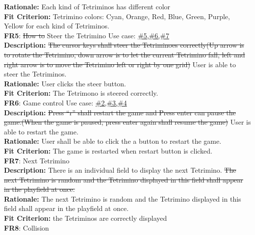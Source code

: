\documentclass[12pt, titlepage]{article}
\begin{document}
\textbf{Rationale: }{\color{red}     Each kind of Tetriminos has different color} \\ 
\textbf{Fit Criterion:} Tetrimino colors: Cyan, Orange, Red, Blue, Green, Purple, Yellow {\color{red}    for each kind of Tetriminos.} \\
\newline
\textbf{FR5}: \st{How to }Steer the Tetrimino   \tab Use case: \hyperref[event:pausethegame]{\#5,}\hyperref[event:rotate]{\#6,\#7} \\
\textbf{Description:} \st{The cursor keys shall steer the Tetriminoes correctly(Up arrow is to rotate the Tetrimino, down arrow is to let the current Tetrimino fall, left and right arrow is to move the Tetrimino left or right by one grid)}{\color{red}    User is able to steer the Tetriminos.} \\
\textbf{Rationale: }{\color{red}     User clicks the steer button. } \\ 
\textbf{Fit Criterion:} {\color{red}    The Tetrimono is steered correctly.} \\
\newline
\textbf{FR6}: Game control \tab Use case: \hyperref[event:pausethegame]{\#2,\#3,\#4} \\
\textbf{Description:} \st{Press “r” shall restart the game and Press enter can pause the game.(When the game is paused, press enter again shall resume the game)}{\color{red}    User is able to restart the game.}\\
\textbf{Rationale: }{\color{red}     User shall be able to click the a button to restart the game. } \\ 
\textbf{Fit Criterion:} {\color{red}    The game is restarted when restart button is clicked.} \\
\newline
\textbf{FR7}: Next Tetrimino\\
\textbf{Description:} There is an individual field to display the next Tetrimino. \st{The next Tetrimino is random and the Tetrimino displayed in this field shall appear in the playfield at once.}\\
\textbf{Rationale: }{\color{red}     The next Tetrimino is random and the Tetrimino displayed in this field shall appear in the playfield at once.} \\ 
\textbf{Fit Criterion:} {\color{red}    the Tetriminos are correctly displayed} \\
\newline
\noindent \textbf{FR8}: Collision\\
\end{document}
